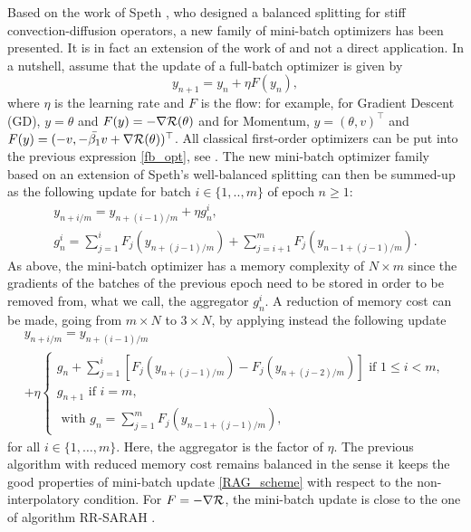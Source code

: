 Based on the work of Speth \cite{rebalanced_splitting}, who designed a balanced splitting for stiff convection-diffusion operators, a new family of mini-batch optimizers has been
presented.  
It is in fact an extension of the work of \cite{rebalanced_splitting} and not a direct application.
In a nutshell, assume that the update of a full-batch optimizer is given by
\begin{equation}
  \label{fb_opt}
        y_{n+1} = y_{n}+\eta F(y_n),
\end{equation}
where $\eta$ is the learning rate and $F$ is the flow: for example, 
for Gradient Descent (GD), $y=\theta$ and $F(y)=-\nabla \mathcal{R}(\theta)$ and 
for Momentum, $y=(\theta,v)^\top$ and $F(y)=(-v, -\bar{\beta_1} v +
\nabla \mathcal{R}(\theta))^\top$. 
All classical first-order optimizers can be put into the previous expression \eqref{fb_opt}, see \cite{Barakat_bianchi}.  
The new mini-batch optimizer family based on an extension of Speth's well-balanced splitting
can then be summed-up as the following update for batch $i\in\{1,..,m\}$ of epoch $n\geq 1$:
\begin{equation}
  \begin{array}{c}
	y_{n+i/m} = y_{n+(i-1)/m}+\eta g_n^i,\\
	g_n^i = \sum_{j=1}^i F_j\left(y_{n+(j-1)/m}\right)+\sum_{j=i+1}^m F_j\left(y_{n-1+(j-1)/m}\right).
  \end{array}
	\label{RAG_scheme}
\end{equation}
As above, the mini-batch optimizer has a memory complexity of $N\times m$ since the gradients of the batches of the previous epoch need to be stored in order to be removed from,
what we call, the aggregator $g_n^i$. A reduction of memory cost can be made, going from $m\times N$ to $3 \times N$, by applying instead the following update
\begin{multline}
	y_{n+i/m} = y_{n+(i-1)/m} \\
	+\eta
	\left\{
	\begin{array}{ll}
		g_n+\displaystyle{\sum_{j=1}^i} \left[F_j\left(y_{n+(j-1)/m}\right)-F_j\left(y_{n+(j-2)/m}\right)\right] \text{ if } 1\leq i<m,\\
		g_{n+1} \text{ if } i=m,\\
                \text{ with } 
	g_n = \sum_{j=1}^m F_j\left(y_{n-1+(j-1)/m}\right),
	\end{array}
	\right.
	\label{RAGL_splitting}
\end{multline}
for all $i \in \{1,\dots,m\}$. Here, the aggregator is the factor of $\eta$. The previous algorithm with reduced memory cost remains balanced in the sense it keeps the good properties of mini-batch update \eqref{RAG_scheme}
with respect to the non-interpolatory condition. 
For $F=-\nabla \mathcal{R}$, the mini-batch update is close to the one of algorithm RR-SARAH \cite{RR_SARAH}.

